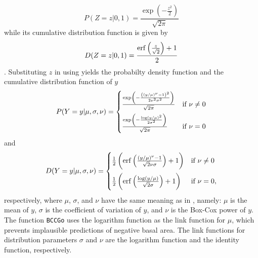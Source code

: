 \begin{equation}
  \label{eq:StandardNormalDistributionPDF}
  P(Z = z|0, 1) =
  \frac{\exp{\left(-\frac{z^2}{2}\right)}}{\sqrt{2 \pi}}
\end{equation}
while its cumulative distribution function is given by
\begin{equation}
  \label{eq:StandardNormalDistributionCDF}
  D(Z = z|0, 1) =
  \frac{\operatorname{erf}\left(\frac{z}{\sqrt{2}}\right) + 1}{2}
  \end{equation}
\parencite{Henze2013,Weisstein2017c}.  Substituting \(z\) in  using  yields the probabilty density function and the cumulative distribution function of \(y\)
\begin{equation}
  \label{eq:BoxCoxColeGreenDistributionPDF}
  P(Y = y|\mu, \sigma, \nu) =
  \begin{cases}
    \frac{\exp\left(-\frac{\left(\left(y \middle/ \mu\right)^\nu - 1\right)^2}{2 \nu^2 \sigma^2}\right)}{\sqrt{2 \pi}} &\text{if } \nu \not = 0 \vspace{0.5em} \\
    \frac{\exp\left(-\frac{\log\left(y \middle/ \mu\right)^2}{2 \sigma^2}\right)}{\sqrt{2 \pi}} &\text{if } \nu = 0
  \end{cases}
\end{equation}
and
\begin{equation}
  \label{eq:BoxCoxColeGreenDistributionCDF}
  D(Y = y|\mu, \sigma, \nu) =
  \begin{cases}
    \frac{1}{2} \left(\erf\left(\frac{\left( y \middle/ \mu \right)^\nu - 1}{\sqrt{2} \nu \sigma}\right) + 1\right) &\text{if } \nu \not = 0 \vspace{0.5em} \\
    \frac{1}{2} \left(\erf\left(\frac{\log\left( y \middle/ \mu \right)}{\sqrt{2} \sigma}\right) + 1\right) &\text{if } \nu = 0,
  \end{cases}
\end{equation}
respectively, where \(\mu\), \(\sigma\), and \(\nu\) have the same meaning as in , namely: \(\mu\) is the mean of \(y\), \(\sigma\) is the coefficient of variation of \(y\), and \(\nu\) is the Box-Cox power of \(y\).  The function \texttt{BCCGo} uses the logarithm function as the link function for \(\mu\), which prevents implausible predictions of negative basal area.  The link functions for distribution parameters \(\sigma\) and \(\nu\) are the logarithm function and the identity function, respectively.

